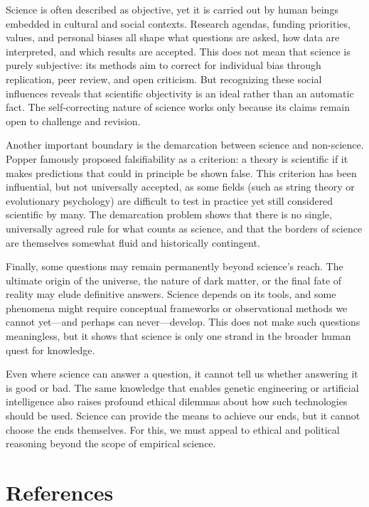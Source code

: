 Science is often described as objective, yet it is carried out by human beings embedded in cultural and social contexts. Research agendas, funding priorities, values, and personal biases all shape what questions are asked, how data are interpreted, and which results are accepted. This does not mean that science is purely subjective: its methods aim to correct for individual bias through replication, peer review, and open criticism. But recognizing these social influences reveals that scientific objectivity is an ideal rather than an automatic fact. The self-correcting nature of science works only because its claims remain open to challenge and revision.

Another important boundary is the demarcation between science and non-science. Popper famously proposed falsifiability as a criterion: a theory is scientific if it makes predictions that could in principle be shown false. This criterion has been influential, but not universally accepted, as some fields (such as string theory or evolutionary psychology) are difficult to test in practice yet still considered scientific by many. The demarcation problem shows that there is no single, universally agreed rule for what counts as science, and that the borders of science are themselves somewhat fluid and historically contingent.

Finally, some questions may remain permanently beyond science's reach. The ultimate origin of the universe, the nature of dark matter, or the final fate of reality may elude definitive answers. Science depends on its tools, and some phenomena might require conceptual frameworks or observational methods we cannot yet—and perhaps can never—develop. This does not make such questions meaningless, but it shows that science is only one strand in the broader human quest for knowledge.

Even where science can answer a question, it cannot tell us whether answering it is good or bad. The same knowledge that enables genetic engineering or artificial intelligence also raises profound ethical dilemmas about how such technologies should be used. Science can provide the means to achieve our ends, but it cannot choose the ends themselves. For this, we must appeal to ethical and political reasoning beyond the scope of empirical science.

%
%

\section*{References}

